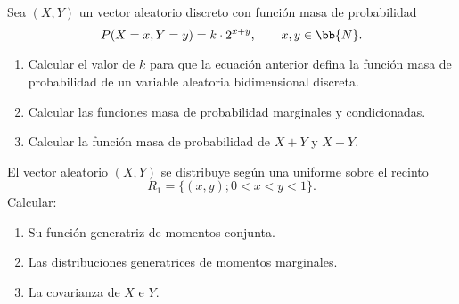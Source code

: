 \begin{ejercicio}
    Sea $(X,Y)$ un vector aleatorio discreto con función masa de probabilidad
    \begin{equation*}
        P(X=x,Y=y) = k\cdot 2^{x+y},\qquad x,y\in\bb{N}.
    \end{equation*}
    \begin{enumerate}
        \item Calcular el valor de $k$ para que la ecuación anterior defina la función masa de probabilidad de un variable aleatoria bidimensional discreta.
        \item Calcular las funciones masa de probabilidad marginales y condicionadas.
        \item Calcular la función masa de probabilidad de $X+Y$ y $X-Y$.
    \end{enumerate}
\end{ejercicio}

\begin{ejercicio}
    El vector aleatorio $(X,Y)$ se distribuye según una uniforme sobre el recinto
    \begin{equation*}
        R_1 = \{(x, y); 0<x<y<1\}.
    \end{equation*}
    Calcular:
    \begin{enumerate}
        \item Su función generatriz de momentos conjunta.
        \item Las distribuciones generatrices de momentos marginales.
        \item La covarianza de $X$ e $Y$.
    \end{enumerate}
\end{ejercicio}